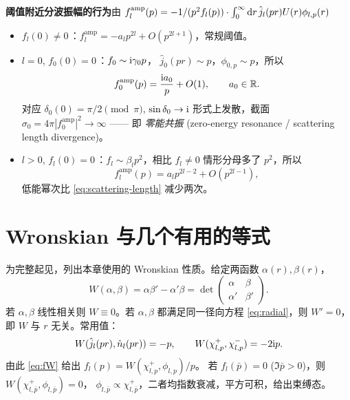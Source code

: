 \textbf{阈值附近分波振幅的行为}\quad 由
$f_l^{\text{amp}}(p)=-1/(p^2 f_l(p))\cdot\int_0^\infty\mathrm{d} r\,\hat j_l(pr)U(r)\phi_{l,p}(r)$
\begin{itemize}
\item $f_l(0)\neq 0$\,：$f_l^{\text{amp}}=-a_l p^{2l}+O(p^{2l+1})$，常规阈值。
\item $l=0$, $f_0(0)=0$\,：$f_0\sim \mathrm{i}\gamma_0 p$，
$\hat j_0(pr)\sim p$，$\phi_{0,p}\sim p$，所以
\begin{equation}
f_0^{\text{amp}}(p)=\frac{\mathrm{i} a_0}{p}+O(1),\qquad a_0\in\mathbb{R}.
\end{equation}
对应 $\delta_0(0)=\pi/2\pmod\pi$, $\sin\delta_0\to\mathrm{i}$ 形式上发散，截面
$\sigma_0=4\pi|f_0^{\text{amp}}|^2\to\infty$ —— 即 \emph{零能共振}
(zero-energy resonance / scattering length divergence)。
\item $l>0$, $f_l(0)=0$\,：$f_l\sim\beta_l p^2$，相比 $f_l\neq 0$ 情形分母多了
$p^2$，所以
\begin{equation}
f_l^{\text{amp}}(p)=a_l p^{2l-2}+O(p^{2l-1}),
\end{equation}
低能幂次比 \eqref{eq:scattering-length} 减少两次。
\end{itemize}

\section{Wronskian 与几个有用的等式}\label{sec:wronskian}

为完整起见，列出本章使用的 Wronskian 性质。给定两函数 $\alpha(r),\beta(r)$，
\begin{equation}
W(\alpha,\beta)=\alpha\beta'-\alpha'\beta=\det\begin{pmatrix}\alpha&\beta\\
\alpha'&\beta'\end{pmatrix}.
\end{equation}
若 $\alpha,\beta$ 线性相关则 $W\equiv 0$。若 $\alpha,\beta$ 都满足同一径向方程
\eqref{eq:radial}，则 $W'=0$，即 $W$ 与 $r$ 无关。常用值：
\begin{equation}
W(\hat j_l(pr),\hat n_l(pr))=-p,\qquad
W(\chi^+_{l,p},\chi^-_{l,p})=-2\mathrm{i} p.
\end{equation}
由此 \eqref{eq:fW} 给出 $f_l(p)=W(\chi^+_{l,p},\phi_{l,p})/p$。
若 $f_l(\bar p)=0$ ($\Im\bar p>0$)，则 $W(\chi^+_{l,\bar p},\phi_{l,\bar p})=0$，
$\phi_{l,\bar p}\propto\chi^+_{l,\bar p}$，二者均指数衰减，平方可积，给出束缚态。

